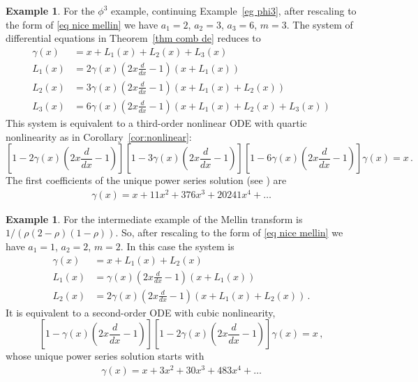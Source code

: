 \documentclass[oneside]{amsart}
\theoremstyle{definition}
\newtheorem{example}[thm]{Example}
\begin{document}
\begin{example}
  For the $\phi^3$ example, continuing Example~\ref{eg phi3}, after rescaling to the form of \eqref{eq nice mellin} we have $a_1=2$, $a_2=3$, $a_3=6$, $m=3$. The system of differential equations in Theorem~\ref{thm comb de} reduces to
  \begin{align*} \gamma(x) & = x + L_1(x) + L_2(x) + L_3(x) \\
 L_1(x) & = 2 \gamma(x) \left(2x\frac{d}{dx}-1\right)\left(x + L_1(x)\right) \\
 L_2(x) & = 3 \gamma(x) \left(2x\frac{d}{dx}-1\right)\left(x + L_1(x) + L_2(x)\right) \\
 L_3(x) & = 6 \gamma(x) \left(2x\frac{d}{dx}-1\right)\left(x + L_1(x) + L_2(x) + L_3(x)\right) \end{align*}
  This system is equivalent to 
  a third-order nonlinear ODE with quartic nonlinearity as in Corollary~\ref{cor:nonlinear}:
\[
\left[1-2 \gamma(x)\left(2x\frac{d}{dx}-1\right)\right]\left[1-3 \gamma(x)\left(2x\frac{d}{dx}-1\right)\right]\left[1-6\gamma(x)\left(2x\frac{d}{dx}-1\right)\right]\gamma(x)=x\,.
\]
The first coefficients of the unique power series solution 
(see \cite[\href{https://oeis.org/A051862}{A051862}]{oeis})
are
%
\begin{eqnarray} \gamma(x)= x+11x^2 +376x^3+20241 x^4+ \dots   \label{eq:hopf236} \end{eqnarray}

\end{example}
\begin{example} \label{eg in}
  For the intermediate example of \cite{BB} the Mellin transform is $1/(\rho(2-\rho)(1-\rho))$. So, after rescaling to the form of \eqref{eq nice mellin} we have $a_1 = 1$, $a_2=2$, $m=2$. In this case the system is
    \begin{align*} \gamma(x) & = x + L_1(x) + L_2(x) \\
 L_1(x) & = \gamma(x) \left(2x\frac{d}{dx}-1\right)\left(x + L_1(x)\right) \\
 L_2(x) & = 2 \gamma(x) \left(2x\frac{d}{dx}-1\right)\left(x + L_1(x) + L_2(x)\right)\,. \end{align*}
    It is equivalent to a second-order ODE with cubic nonlinearity,
\[
\left[1- \gamma(x)\left(2x\frac{d}{dx}-1\right)\right]\left[1-2 \gamma(x)\left(2x\frac{d}{dx}-1\right)\right]\gamma(x)=x\,,
\]
whose unique power series solution starts with
\begin{eqnarray} \gamma(x)= x+3x^2 +30x^3+483 x^4+ \dots   \label{eq:hopf12} \end{eqnarray}
\end{example}
\end{document}

